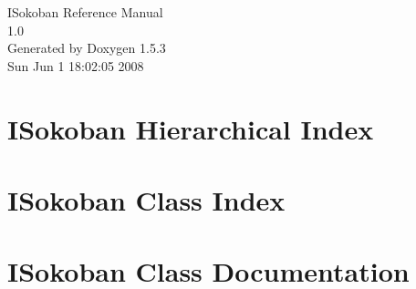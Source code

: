 \documentclass[a4paper]{book}
\begin{document}
\begin{titlepage}
\vspace*{7cm}
\begin{center}
{\Large ISokoban Reference Manual\\[1ex]\large 1.0 }\\
\vspace*{1cm}
{\large Generated by Doxygen 1.5.3}\\
\vspace*{0.5cm}
{\small Sun Jun 1 18:02:05 2008}\\
\end{center}
\end{titlepage}
\clearemptydoublepage
{}
\tableofcontents
\clearemptydoublepage
{}
\chapter{ISokoban Hierarchical Index}

\chapter{ISokoban Class Index}

\chapter{ISokoban Class Documentation}


























\printindex
\end{document}
